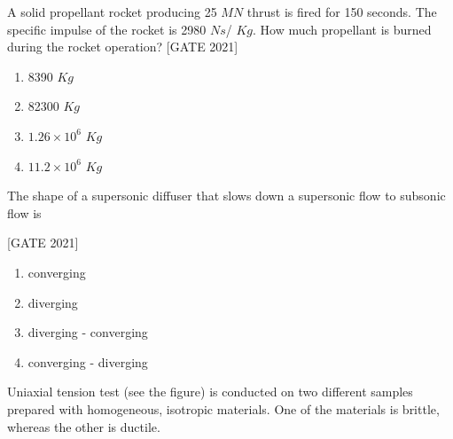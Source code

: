 \vspace{1cm}

\item A solid propellant rocket producing 25 $MN$ thrust is fired for 150 seconds. The specific impulse of the rocket is 2980 $Ns$/ $Kg$. How much propellant is burned during the rocket operation?
\hfill{[GATE 2021]}
 \begin{multicols}{4}
\begin{enumerate} 
    
        \item 8390  $Kg$
        \item 82300  $Kg$
        \item $1.26 \times 10^6$  $Kg$
        \item $11.2 \times 10^6$  $Kg$
    \end{enumerate}
    \end{multicols}

\item The shape of a supersonic diffuser that slows down a supersonic flow to subsonic flow is

 \hfill{[GATE 2021]}\begin{multicols}{2}\begin{enumerate}
 \item converging
    \item diverging
 \item diverging - converging
   
   
    \item converging -  diverging
\end{enumerate}
\end{multicols}

\item Uniaxial tension test (see the figure) is conducted on two different samples prepared with homogeneous, isotropic materials. One of the materials is brittle, whereas the other is ductile.
\begin{figure}[!ht]
\centering
{}%
\end{figure}




